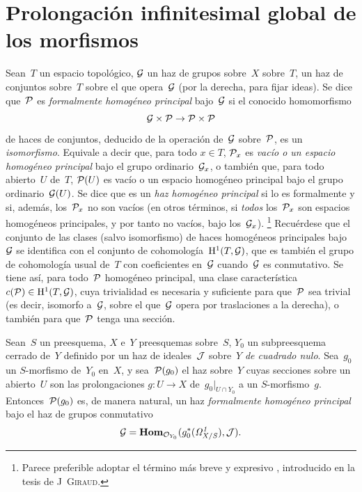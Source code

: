 
\section{Prolongación infinitesimal global de los morfismos}
\label{III.5}

Sean~$T$ un espacio topológico, $\cal{G}$ un haz de grupos
{sobre~$X$}
{sobre~$T$},
un haz de conjuntos sobre~$T$ sobre el que opera~$\cal{G}$ (por la derecha, para fijar ideas). Se dice que~$\cal{P}$ es \emph{formalmente homogéneo principal}
%
bajo~$\cal{G}$ si el conocido homomorfismo
$$
\cal{G}\times\cal{P}\to\cal{P}\times\cal{P}
$$
de haces de conjuntos, deducido de la operación de~$\cal{G}$ sobre~$\cal{P}$, es un \emph{isomorfismo}. Equivale a decir que, para todo $x\in T$, $\cal{P}_x$ es \emph{vacío o un espacio homogéneo principal} bajo el grupo ordinario~$\cal{G}_x$, o también que, para todo abierto~$U$ de~$T$, $\cal{P}(U)$ es vacío o un espacio homogéneo principal bajo el grupo ordinario~$\cal{G}(U)$. Se dice que
es un \emph{haz homogéneo principal}
%
si lo es formalmente y si, además, los~$\cal{P}_x$ no son vacíos (en otros términos, si \emph{todos} los~$\cal{P}_x$ son espacios homogéneos principales, y por tanto no vacíos, bajo los~$\cal{G}_x$).
\footnote{Parece preferible adoptar el término más breve y expresivo
,
introducido en la tesis de J\ptbl\ \textsc{Giraud}.}
Recuérdese que el conjunto de las clases (salvo isomorfismo) de haces homogéneos principales bajo~$\cal{G}$ se identifica con el conjunto de cohomología~$\H^1(T,\cal{G})$, que es también el grupo de cohomología usual de~$T$ con coeficientes en~$\cal{G}$ cuando~$\cal{G}$ es conmutativo. Se tiene así, para todo~$\cal{P}$ homogéneo principal, una clase característica $c(\cal{P})\in\H^1(T,\cal{G})$, cuya trivialidad es necesaria y suficiente para que~$\cal{P}$ sea trivial (es decir, isomorfo a~$\cal{G}$, sobre el que~$\cal{G}$ opera por traslaciones a la derecha), o también para que~$\cal{P}$ tenga una sección.

\begin{proposition}
\label{III.5.1}
Sean~$S$ un preesquema, $X$ e~$Y$ preesquemas sobre~$S$, $Y_0$ un subpreesquema cerrado de~$Y$ definido por un haz de ideales~$\cal{J}$ sobre~$Y$ \emph{de cuadrado nulo}. Sea~$g_0$ un $S$-morfismo de~$Y_0$ en~$X$, y sea~$\cal{P}(g_0)$ el haz sobre~$Y$ cuyas secciones sobre un abierto~$U$ son las prolongaciones $g\colon U\to X$ de~$g_0|_{U\cap Y_0}$ a un $S$-morfismo~$g$. Entonces~$\cal{P}(g_0)$ es, de manera natural, un haz \emph{formalmente homogéneo principal} bajo el haz de grupos conmutativo
$$
\cal{G}=\SheafHom_{\cal{O}_{Y_0}}(g_0^*(\it{\Omega}^1_{X/S}),\cal{J}).
$$
\end{proposition}

